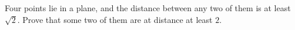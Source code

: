 Four points lie in a plane, and the distance between any two of them is at least $\sqrt2$. Prove that some two of them are at distance at least $2$.
